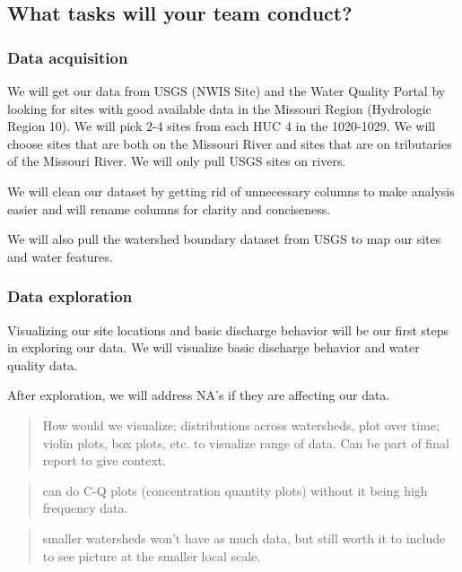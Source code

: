 \documentclass[]{article}
\begin{document}
\hypertarget{what-tasks-will-your-team-conduct}{%
\subsection{What tasks will your team
conduct?}\label{what-tasks-will-your-team-conduct}}

\hypertarget{data-acquisition}{%
\subsubsection{Data acquisition}\label{data-acquisition}}

We will get our data from USGS (NWIS Site) and the Water Quality Portal
by looking for sites with good available data in the Missouri Region
(Hydrologic Region 10). We will pick 2-4 sites from each HUC 4 in the
1020-1029. We will choose sites that are both on the Missouri River and
sites that are on tributaries of the Missouri River. We will only pull
USGS sites on rivers.

We will clean our dataset by getting rid of unnecessary columns to make
analysis easier and will rename columns for clarity and conciseness.

We will also pull the watershed boundary dataset from USGS to map our
sites and water features.

\hypertarget{data-exploration}{%
\subsubsection{Data exploration}\label{data-exploration}}

Visualizing our site locations and basic discharge behavior will be our
first steps in exploring our data. We will visualize basic discharge
behavior and water quality data.

After exploration, we will address NA's if they are affecting our data.

\begin{quote}
How would we visualize; distributions across watersheds, plot over time;
violin plots, box plots, etc. to visualize range of data. Can be part of
final report to give context.
\end{quote}

\begin{quote}
can do C-Q plots (concentration quantity plots) without it being high
frequency data.
\end{quote}

\begin{quote}
smaller watersheds won't have as much data, but still worth it to
include to see picture at the smaller local scale.
\end{quote}
\end{document}
